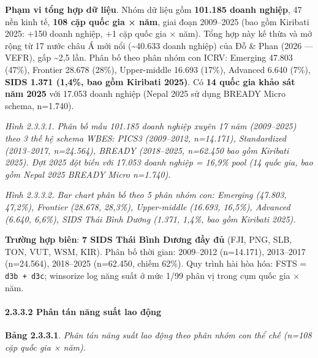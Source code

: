 \documentclass[12pt,a4paper]{article}
\begin{document}
\textbf{Phạm vi tổng hợp dữ liệu}. Nhóm dữ liệu gồm \textbf{101.185
doanh nghiệp}, 47 nền kinh tế, \textbf{108 cặp quốc gia × năm}, giai
đoạn 2009--2025 (bao gồm Kiribati 2025: +150 doanh nghiệp, +1 cặp quốc
gia × năm). Tổng hợp này kế thừa và mở rộng từ 17 nước châu Á mới nổi
(\textasciitilde40.633 doanh nghiệp) của Đỗ \& Phan (2026 --- VEFR), gấp
\textasciitilde2,5 lần. Phân bố theo phân nhóm con ICRV: Emerging 47.803
(47\%), Frontier 28.678 (28\%), Upper-middle 16.693 (17\%), Advanced
6.640 (7\%), \textbf{SIDS 1.371 (1,4\%, bao gồm Kiribati 2025)}. Có
\textbf{14 quốc gia khảo sát năm 2025} với 17.053 doanh nghiệp (Nepal
2025 sử dụng BREADY Micro schema, n=1.740).

\emph{Hình 2.3.3.1. Phân bố mẫu 101.185 doanh nghiệp xuyên 17 năm
(2009--2025) theo 3 thế hệ schema WBES: PICS3 (2009--2012, n=14.171),
Standardized (2013--2017, n=24.564), BREADY (2018--2025, n=62.450 bao
gồm Kiribati 2025). Đợt 2025 đột biến với 17.053 doanh nghiệp = 16,9\%
pool (14 quốc gia, bao gồm Nepal 2025 BREADY Micro n=1.740).}

\emph{Hình 2.3.3.2. Bar chart phân bố theo 5 phân nhóm con: Emerging
(47.803, 47,2\%), Frontier (28.678, 28,3\%), Upper-middle (16.693,
16,5\%), Advanced (6.640, 6,6\%), SIDS Thái Bình Dương (1.371, 1,4\%,
bao gồm Kiribati 2025).}

\textbf{Trường hợp biên}: \textbf{7 SIDS Thái Bình Dương đầy đủ} (FJI,
PNG, SLB, TON, VUT, WSM, KIR). Phân bố thời gian: 2009--2012 (n=14.171),
2013--2017 (n=24.564), 2018--2025 (n=62.450, chiếm 62\%). Quy trình hài
hòa hóa: FSTS = \texttt{d3b\ +\ d3c}; winsorize log năng suất ở mức 1/99
phân vị trong cụm quốc gia × năm.

\hypertarget{2332-phuxe2n-tuxe1n-nux103ng-suux1ea5t-lao-ux111ux1ed9ng}{%
\paragraph{2.3.3.2 Phân tán năng suất lao
động}\label{2332-phuxe2n-tuxe1n-nux103ng-suux1ea5t-lao-ux111ux1ed9ng}}

\textbf{Bảng 2.3.3.1}. \emph{Phân tán năng suất lao động theo phân nhóm
con thể chế (n=108 cặp quốc gia × năm).}
\end{document}
